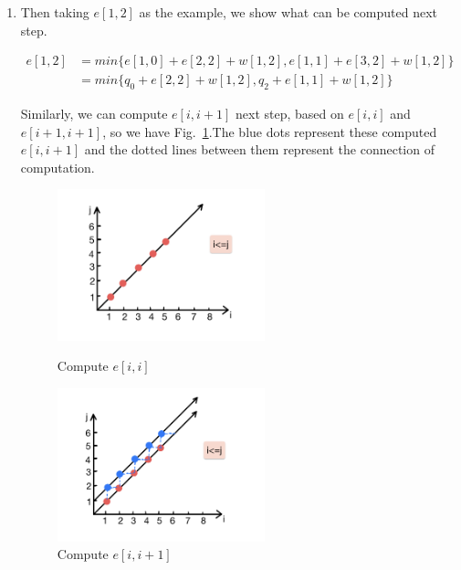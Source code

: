 \documentclass[12pt,a4paper]{article}
\makeatletter
\newtheorem*{solution}{Solution}
\theoremstyle{definition}
\renewenvironment{solution}[1][Solution] {\par\pushQED{\qed}\normalfont\topsep6\p@\@plus6\p@\relax\trivlist\item[\hskip\labelsep\bfseries#1\@addpunct{.}]\ignorespaces}{\popQED\endtrivlist\@endpefalse} \makeatother
\makeatother
\begin{document}
\begin{enumerate}
\begin{enumerate}
\begin{solution}
  
            Then taking $e[1,2]$ as the example, we show what can be computed next step.
            
            \begin{equation}
                \begin{split}
                    \label{eq2}
                    e[1,2]&=min\{e[1,0]+e[2,2]+w[1,2], e[1,1]+e[3,2]+w[1,2]\}\\
                    &=min\{ q_0+e[2,2]+w[1,2], q_2+e[1,1]+w[1,2]\}
                \end{split}
            \end{equation}
            
            Similarly, we can compute $e[i,i+1]$ next step, based on $e[i,i]$ and $e[i+1,i+1]$, so we have Fig.~\ref{axis2}.{\color{blue}The blue dots} represent these computed $e[i,i+1]$ and the dotted lines between them represent the connection of computation.
            
              \begin{figure}[htbp]
            \centering
            \begin{minipage}[t]{0.48\textwidth}
            \centering
            \includegraphics[width=6cm]{Lab05-YanjieZe/axis1.jpg}
           \caption{Compute $e[i,i]$}\label{axis1}
            \end{minipage}
            \begin{minipage}[t]{0.48\textwidth}
            \centering
            \includegraphics[width=6cm]{Lab05-YanjieZe/axis2.jpg}
            \caption{Compute $e[i,i+1]$}\label{axis2}
            \end{minipage}
            \end{figure}
            

\end{solution}
\end{enumerate}
\end{enumerate}
\end{document}

